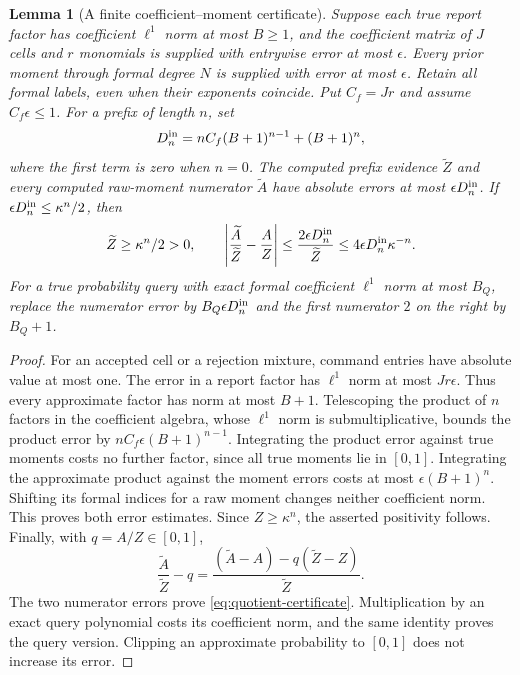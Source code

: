 \documentclass[11pt]{amsart}
\newtheorem{lemma}[theorem]{Lemma}
\theoremstyle{definition}\newtheorem{definition}[theorem]{Definition}
\theoremstyle{remark}\newtheorem{remark}[theorem]{Remark}
\begin{document}
\begin{lemma}[A finite coefficient--moment certificate]
\label{lem:explicit-moment-certificate}
Suppose each true report factor has coefficient $\ell^1$ norm at most
$B\ge1$, and the coefficient matrix of $J$ cells and $r$ monomials
is supplied with entrywise error at most $\epsilon$. Every prior moment
through formal degree $N$ is supplied with error at most $\epsilon$.
Retain all formal labels, even when their exponents coincide. Put
$C_f=Jr$ and assume $C_f\epsilon\le1$. For a prefix of length $n$,
set
\[
 D_n^{\rm in}=nC_f(B+1)^{n-1}+(B+1)^n,
\]
where the first term is zero when $n=0$. The computed prefix evidence
$\widetilde Z$ and every computed raw-moment numerator
$\widetilde A$ have absolute errors at most
$\epsilon D_n^{\rm in}$. If
$\epsilon D_n^{\rm in}\le\kappa^n/2$, then
\begin{equation}\label{eq:quotient-certificate}
 \widetilde Z\ge\kappa^n/2>0,\qquad
 \left|\frac{\widetilde A}{\widetilde Z}-\frac A Z\right|
       \le\frac{2\epsilon D_n^{\rm in}}{\widetilde Z}
       \le4\epsilon D_n^{\rm in}\kappa^{-n}.
\end{equation}
For a true probability query with exact formal coefficient $\ell^1$
norm at most $B_Q$, replace the numerator error by
$B_Q\epsilon D_n^{\rm in}$ and the first numerator $2$ on the
right by $B_Q+1$.
\end{lemma}
\begin{proof}
For an accepted cell or a rejection mixture, command entries have
absolute value at most one. The error in a report factor has
$\ell^1$ norm at most $Jr\epsilon$. Thus every approximate factor
has norm at most $B+1$. Telescoping the product of $n$ factors in the
coefficient algebra, whose $\ell^1$ norm is submultiplicative, bounds
the product error by
$nC_f\epsilon(B+1)^{n-1}$. Integrating the product error against true
moments costs no further factor, since all true moments lie in $[0,1]$.
Integrating the approximate product against the moment errors costs at
most $\epsilon(B+1)^n$. Shifting its formal indices for a raw moment
changes neither coefficient norm. This proves both error estimates.
Since $Z\ge\kappa^n$, the asserted positivity follows. Finally,
with $q=A/Z\in[0,1]$,
\[
 \frac{\widetilde A}{\widetilde Z}-q
 =\frac{(\widetilde A-A)-q(\widetilde Z-Z)}{\widetilde Z}.
\]
The two numerator errors prove \eqref{eq:quotient-certificate}.
Multiplication by an exact query polynomial costs its coefficient norm,
and the same identity proves the query version. Clipping an approximate
probability to $[0,1]$ does not increase its error.
\end{proof}
\end{document}
